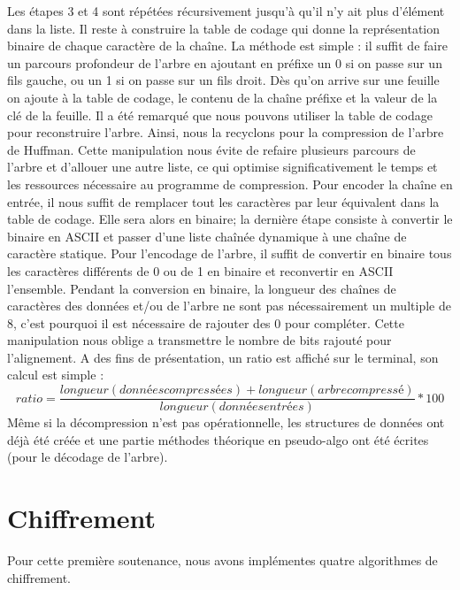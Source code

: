         Les étapes 3 et 4 sont répétées récursivement jusqu'à qu'il n'y ait plus d'élément dans la liste.
        Il reste à construire la table de codage qui donne la représentation binaire de chaque caractère de la chaîne. La méthode est simple : il suffit de faire un parcours profondeur de l'arbre en ajoutant en préfixe un 0 si on passe sur un fils gauche, ou un 1 si on passe sur un fils droit. Dès qu'on arrive sur une feuille on ajoute à la table de codage, le contenu de la chaîne préfixe et la valeur de la clé de la feuille.
        Il a été remarqué que nous pouvons utiliser la table de codage pour reconstruire l'arbre. Ainsi, nous la recyclons pour la compression de l'arbre de Huffman. Cette manipulation nous évite de refaire plusieurs parcours de l'arbre et d'allouer une autre liste, ce qui optimise significativement le temps et les ressources nécessaire au programme de compression.
        Pour encoder la chaîne en entrée, il nous suffit de remplacer tout les caractères par leur équivalent dans la table de codage. Elle sera alors en binaire; la dernière étape consiste à convertir le binaire en ASCII et passer d'une liste chaînée dynamique à une chaîne de caractère statique.
        Pour l'encodage de l'arbre, il suffit de convertir en binaire tous les caractères différents de 0 ou de 1 en binaire et reconvertir en ASCII l'ensemble.
        Pendant la conversion en binaire, la longueur des chaînes de caractères des données et/ou de l'arbre ne sont pas nécessairement un multiple de 8, c'est pourquoi il est nécessaire de rajouter des 0 pour compléter. Cette manipulation nous oblige a transmettre le nombre de bits rajouté pour l'alignement.
        A des fins de présentation, un ratio est affiché sur le terminal, son calcul est simple :
        \[
            ratio = \frac{longueur(données compressées) + longueur(arbre compressé)}{longueur(données entrées)} * 100
        \]
        Même si la décompression n'est pas opérationnelle, les structures de données ont déjà été créée et une partie méthodes théorique en pseudo-algo ont été écrites (pour le décodage de l'arbre).
    
        
    
\newpage

\section{Chiffrement}
    
        Pour cette première soutenance, nous avons implémentes quatre algorithmes de chiffrement.

